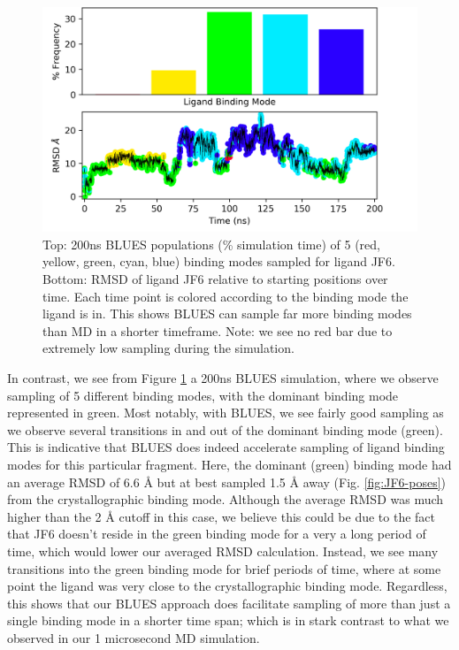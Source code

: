 \begin{figure}
    \centering
    \includegraphics{chapter6/Figures/JF6_c4-14607404.png}
    \caption[JF6 BLUES Populations]{Top: 200ns BLUES populations (\% simulation time) of 5 (red, yellow, green, cyan, blue) binding modes sampled for ligand JF6. Bottom: RMSD of ligand JF6 relative to starting positions over time. Each time point is colored according to the binding mode the ligand is in. This shows BLUES can sample far more binding modes than MD in a shorter timeframe. Note: we see no red bar due to extremely low sampling during the simulation.}
    \label{fig:JF6_c4-blues}
\end{figure}

In contrast, we see from Figure \ref{fig:JF6_c4-blues} a 200ns BLUES simulation, where we observe sampling of 5 different binding modes, with the dominant binding mode represented in green.
Most notably, with BLUES, we see fairly good sampling as we observe several transitions in and out of the dominant binding mode (green).
This is indicative that BLUES does indeed accelerate sampling of ligand binding modes for this particular fragment.
Here, the dominant (green) binding mode had an average RMSD of 6.6 {\AA} but at best sampled 1.5 {\AA} away (Fig. \ref{fig:JF6-poses}) from the crystallographic binding mode.
Although the average RMSD was much higher than the 2 {\AA} cutoff in this case, we believe this could be due to the fact that JF6 doesn't reside in the green binding mode for a very a long period of time, which would lower our averaged RMSD calculation.
Instead, we see many transitions into the green binding mode for brief periods of time, where at some point the ligand was very close to the crystallographic binding mode.
Regardless, this shows that our BLUES approach does facilitate sampling of more than just a single binding mode in a shorter time span; which is in stark contrast to what we observed in our 1 microsecond MD simulation.

